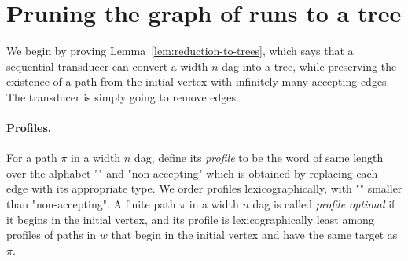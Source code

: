 \section{Pruning the graph of runs to a tree}
\label{sec:reduction-to-trees}
We begin by proving Lemma~\ref{lem:reduction-to-trees}, which says that a sequential transducer can convert a width $n$ dag into a tree, while preserving  the  existence of a path from the initial vertex with infinitely many accepting edges. The transducer is simply going to remove edges.






\paragraph*{Profiles.} For a path $\pi$ in a  width $n$ dag, define its \emph{profile} to be the word of same length over the alphabet "" and "non-accepting" which is obtained by replacing each edge with its appropriate type. We  order profiles lexicographically, with ""  smaller than "non-accepting". 
A finite path $\pi$ in a width $n$ dag is called \emph{profile optimal} if it begins in the initial vertex, and its profile is lexicographically least among profiles of  paths in $w$ that begin in the initial vertex and have the same target as $\pi$.

